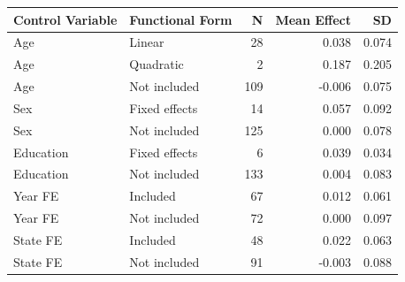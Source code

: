 \begin{tabular}{@{}l l r r r@{}}
\toprule
Control Variable & Functional Form & N & Mean Effect & SD \\
\midrule
Age & Linear & 28 & 0.038 & 0.074 \\
Age & Quadratic & 2 & 0.187 & 0.205 \\
Age & Not included & 109 & -0.006 & 0.075 \\
Sex & Fixed effects & 14 & 0.057 & 0.092 \\
Sex & Not included & 125 & 0.000 & 0.078 \\
Education & Fixed effects & 6 & 0.039 & 0.034 \\
Education & Not included & 133 & 0.004 & 0.083 \\
Year FE & Included & 67 & 0.012 & 0.061 \\
Year FE & Not included & 72 & 0.000 & 0.097 \\
State FE & Included & 48 & 0.022 & 0.063 \\
State FE & Not included & 91 & -0.003 & 0.088 \\
\bottomrule
\end{tabular}